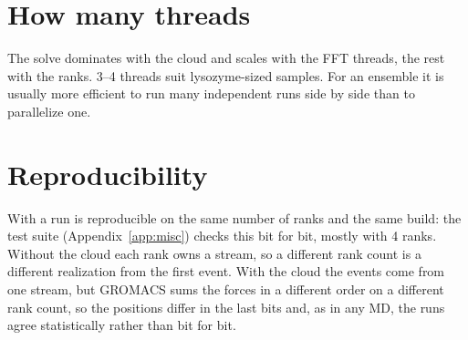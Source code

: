\section{How many threads}

The solve dominates with the cloud and scales with the FFT threads, the rest with the ranks.
3--4 threads suit lysozyme-sized samples.
For an ensemble it is usually more efficient to run many independent runs side by side than to parallelize one.

\section{Reproducibility}

With  a run is reproducible on the same number of ranks and the same build: the test suite
(Appendix~\ref{app:misc}) checks this bit for bit, mostly with 4 ranks.
Without the cloud each rank owns a stream, so a different rank count is a different realization from the first event.
With the cloud the events come from one stream, but GROMACS sums the forces in a different order on a different rank
count, so the positions differ in the last bits and, as in any MD, the runs agree statistically rather than bit for bit.
